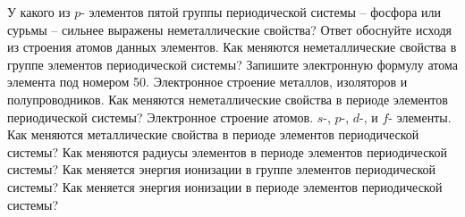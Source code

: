 \Qvery 
У какого из $p$- элементов пятой группы периодической системы -- фосфора или сурьмы -- сильнее выражены неметаллические свойства? Ответ обоснуйте исходя из строения атомов данных элементов.
\endQvery
\Qvery 
Как меняются неметаллические свойства в группе элементов периодической системы? Запишите электронную формулу атома элемента под номером 50.
\endQvery
\Qvery 
Электронное строение металлов, изоляторов и полупроводников. Как меняются неметаллические свойства в периоде элементов периодической системы?
\endQvery
\Qvery 
Электронное строение атомов. $s$-, $p$-, $d$-, и $f$- элементы. Как меняются металлические свойства в периоде элементов периодической системы? 
\endQvery
\Qvery 
Как меняются радиусы элементов в периоде элементов периодической системы? 
\endQvery
\Qvery 
Как меняется энергия ионизации в группе элементов периодической системы?
\endQvery
\Qvery 
Как меняется энергия ионизации в периоде элементов периодической системы? 
\endQvery